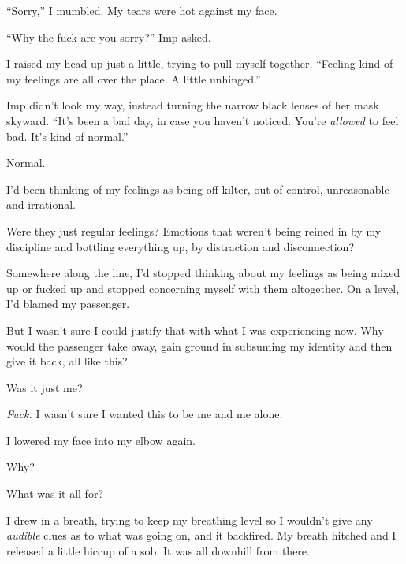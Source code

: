 ``Sorry,'' I mumbled.  My tears were hot against my face.



``Why the fuck are you sorry?'' Imp asked.



I raised my head up just a little, trying to pull myself together.  ``Feeling kind of- my feelings are all over the place.  A little unhinged.''



Imp didn't look my way, instead turning the narrow black lenses of her mask skyward.  ``It's been a bad day, in case you haven't noticed.  You're \emph{allowed} to feel bad.  It's kind of normal.''



Normal.



I'd been thinking of my feelings as being off-kilter, out of control, unreasonable and irrational.



Were they just regular feelings?  Emotions that weren't being reined in by my discipline and bottling everything up, by distraction and disconnection?



Somewhere along the line, I'd stopped thinking about my feelings as being mixed up or fucked up and stopped concerning myself with them altogether.  On a level, I'd blamed my passenger.



But I wasn't sure I could justify that with what I was experiencing now.  Why would the passenger take away, gain ground in subsuming my identity and then give it back, all like this?



Was it just me?



\emph{Fuck. } I wasn't sure I wanted this to be me and me alone.



I lowered my face into my elbow again.



Why?



What was it all for?



I drew in a breath, trying to keep my breathing level so I wouldn't give any \emph{audible} clues as to what was going on, and it backfired.  My breath hitched and I released a little hiccup of a sob.  It was all downhill from there.



